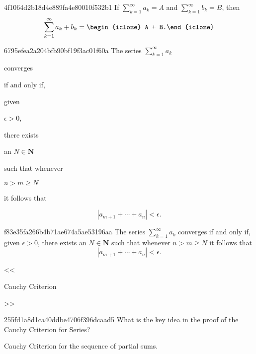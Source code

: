 \begin{note}{4f1064d2b18d4e889fa4e80010f532b1}
    If \({ \sum_{k=1}^{\infty} a_k = A }\) and \({ \sum_{k=1}^{\infty} b_k = B }\), then
    \[
        \sum_{k=1}^{\infty} a_k + b_k = \begin{icloze}{1}A + B.\end{icloze}
    \]
\end{note}

\begin{note}{6795efea2a204bfb90bf19f3ac01f60a}
    The series \({ \sum_{k=1}^{\infty} a_k }\) \begin{icloze}{5}converges\end{icloze} \begin{icloze}{4}if and only if,\end{icloze} given \begin{icloze}{3}\({ \epsilon > 0 }\),\end{icloze} there exists \begin{icloze}{2}an \({ N \in \mathbf{N} }\)\end{icloze} such that whenever \begin{icloze}{2}\({ n > m \geq N }\)\end{icloze} it follows that
    \begin{icloze}{1}
        \[
            \left\lvert a_{m + 1} + \cdots + a_n \right\rvert < \epsilon.
        \]
    \end{icloze}
\end{note}

\begin{note}{f83e35fa266b4b71ae674a5ae53196aa}
    The series \({ \sum_{k=1}^{\infty} a_k }\) converges if and only if, given \({ \epsilon > 0 }\), there exists an \({ N \in \mathbf{N} }\) such that whenever \({ n > m \geq N }\) it follows that
    \[
        \left\lvert a_{m + 1} + \cdots + a_n \right\rvert < \epsilon.
    \]

    \begin{center}
        \tiny
        <<\begin{icloze}{1}Cauchy Criterion\end{icloze}>>
    \end{center}
\end{note}

\begin{note}{255fd1a8d1ca40ddbe4706f396dcaad5}
    What is the key idea in the proof of the Cauchy Criterion for Series?

    \begin{cloze}{1}
        Cauchy Criterion for the sequence of partial sums.
    \end{cloze}
\end{note}

